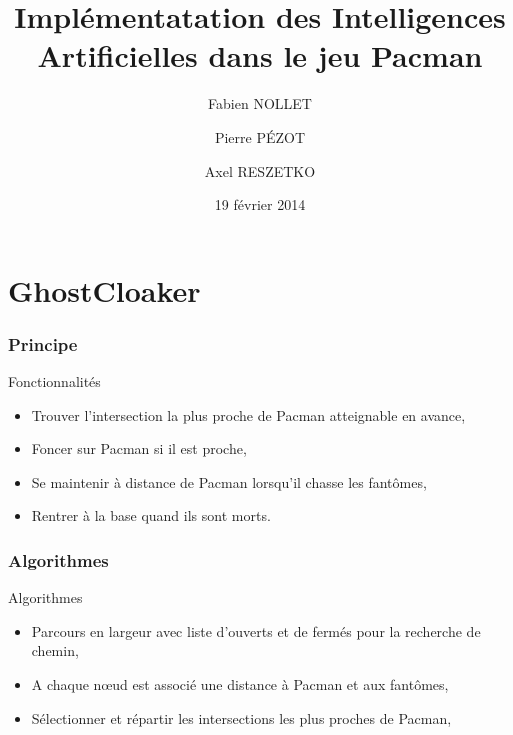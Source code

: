 \documentclass[c]{beamer}
\title[Projet d'Intelliigence Artificielle]{Implémentatation des Intelligences Artificielles dans le jeu Pacman }
\author{Fabien NOLLET \and Pierre P\'EZOT \and Axel RESZETKO}
\date{19 février 2014}
\institute{TELECOM Nancy}
\begin{document}
\begin{frame}
  \maketitle
\end{frame}

  \begin{frame}
  \tableofcontents
\end{frame}

\section{GhostCloaker}
\begin{frame}
    \frametitle{Principe}
    \begin{block}{Fonctionnalités}
        \begin{itemize}
            \item Trouver l'intersection la plus proche de Pacman atteignable en avance,
            \item Foncer sur Pacman si il est proche,
            \item Se maintenir à distance de Pacman lorsqu'il chasse les fantômes,
            \item Rentrer à la base quand ils sont morts.
        \end{itemize}
    \end{block}
\end{frame}

\begin{frame}
	\frametitle{Algorithmes}
	\begin{block}{Algorithmes}
	\begin{itemize}
        \item Parcours en largeur avec liste d'ouverts et de fermés pour la recherche de chemin,
        \item A chaque n\oe ud est associé une distance à Pacman et aux fantômes,
        \item Sélectionner et répartir les intersections les plus proches de Pacman,
	\end{itemize}
	\end{block}
\end{frame}
\end{document}
